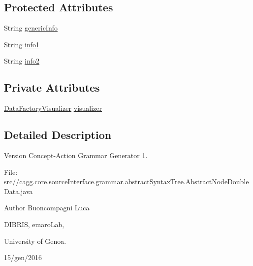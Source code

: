 \subsection*{Protected Attributes}
\begin{DoxyCompactItemize}
\item 
String \hyperlink{classit_1_1emarolab_1_1cagg_1_1core_1_1language_1_1syntax_1_1abstractTree_1_1AbstractNodeDoubleData_3_01I1_00_01I2_01_4_a5ef36526dc1f963c1c7fb5ca96b098ae}{generic\-Info}
\item 
String \hyperlink{classit_1_1emarolab_1_1cagg_1_1core_1_1language_1_1syntax_1_1abstractTree_1_1AbstractNodeDoubleData_3_01I1_00_01I2_01_4_a9cb0eda61491d6c704ee75948a93621a}{info1}
\item 
String \hyperlink{classit_1_1emarolab_1_1cagg_1_1core_1_1language_1_1syntax_1_1abstractTree_1_1AbstractNodeDoubleData_3_01I1_00_01I2_01_4_a30a15f6156a57ad8415df26edd3436da}{info2}
\end{DoxyCompactItemize}
\subsection*{Private Attributes}
\begin{DoxyCompactItemize}
\item 
\hyperlink{classit_1_1emarolab_1_1cagg_1_1core_1_1language_1_1syntax_1_1abstractTree_1_1AbstractDataFactory_1_1DataFactoryVisualizer}{Data\-Factory\-Visualizer} \hyperlink{classit_1_1emarolab_1_1cagg_1_1core_1_1language_1_1syntax_1_1abstractTree_1_1AbstractNodeDoubleData_3_01I1_00_01I2_01_4_a7f90846ee58c1fc6dc186c75d02e5c8c}{visualizer}
\end{DoxyCompactItemize}


\subsection{Detailed Description}
\begin{DoxyVersion}{Version}
Concept-\/\-Action Grammar Generator 1. \par
 File\-: src//cagg.core.\-source\-Interface.\-grammar.\-abstract\-Syntax\-Tree.\-Abstract\-Node\-Double\-Data.\-java \par

\end{DoxyVersion}
\begin{DoxyAuthor}{Author}
Buoncompagni Luca \par
 D\-I\-B\-R\-I\-S, emaro\-Lab,\par
 University of Genoa. \par
 15/gen/2016 \par

\end{DoxyAuthor}


